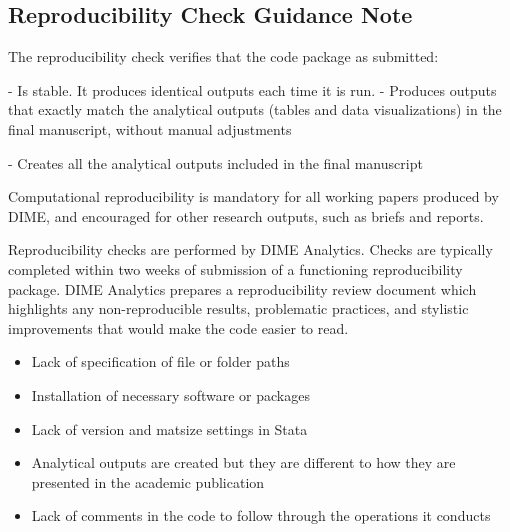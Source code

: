 


	\begin{fullwidth}


	\section*{Reproducibility Check Guidance Note}

	The reproducibility check verifies that the code package as submitted: 

- 	Is stable. It produces identical outputs each time it is run. 
- 	Produces outputs that exactly match the analytical outputs (tables and data visualizations) in the final manuscript, without manual adjustments 

- Creates all the analytical outputs included in the final manuscript

Computational reproducibility is mandatory for all working papers produced by DIME, and encouraged for other research outputs, such as briefs and reports. 


	\bigskip

Reproducibility checks are performed by DIME Analytics. Checks are typically completed within two weeks of submission of a functioning reproducibility package. DIME Analytics prepares a reproducibility review document which highlights any non-reproducible results, problematic practices, and stylistic improvements that would make the code easier to read. 

	\bigskip

	\begin{itemize}
		\setlength\itemsep{-0.1em}
		\item Lack of specification of file or folder paths
		\item Installation of necessary software or packages
		\item Lack of version and matsize settings in Stata
		\item Analytical outputs are created but they are different to how they are presented in the academic publication
		\item Lack of comments in the code to follow through the operations it conducts
	\end{itemize}


\end{fullwidth}
